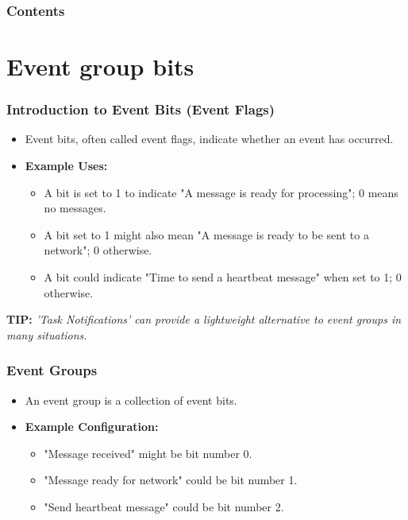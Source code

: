 \documentclass[10pt]{beamer}
\title[Universidad Panamericana]{}
\subtitle{FreeRTOS synchronization methods part 2}
\author[]{Name}
\institute[ltonix@up.edu.mx]{Universidad Panamericana}
\date[Presentation \today]{Presentation \today}
\begin{document}
\frame{\titlepage}
\begin{frame}
\frametitle{Contents}
\tableofcontents
\end{frame}


\section{Event group bits}

\begin{frame}
    \frametitle{Introduction to Event Bits (Event Flags)}
    \begin{itemize}
      \item Event bits, often called event flags, indicate whether an event has occurred.
      \item \textbf{Example Uses:}
      \begin{itemize}
        \item A bit is set to 1 to indicate "A message is ready for processing"; 0 means no messages.
        \item A bit set to 1 might also mean "A message is ready to be sent to a network"; 0 otherwise.
        \item A bit could indicate "Time to send a heartbeat message" when set to 1; 0 otherwise.
      \end{itemize}
    \end{itemize}
    \textbf{TIP:} \textit{'Task Notifications' can provide a lightweight alternative to event groups in many situations.}
  \end{frame}
  
  \begin{frame}
    \frametitle{Event Groups}
    \begin{itemize}
      \item An event group is a collection of event bits.
      \item \textbf{Example Configuration:}
      \begin{itemize}
        \item "Message received" might be bit number 0.
        \item "Message ready for network" could be bit number 1.
        \item "Send heartbeat message" could be bit number 2.
      \end{itemize}
    \end{itemize}
  \end{frame}
  
\end{document}
